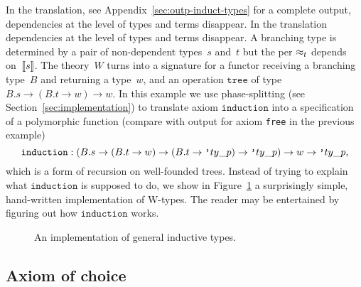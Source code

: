 \iflong
In the translation, see Appendix~\ref{sec:outp-induct-types} for a
complete output, dependencies at the level of types and terms disappear.
\else
In the translation dependencies at the level of types and terms disappear.
\fi
%
A branching type is determined by a pair of non-dependent types~$s$
and~$t$ but the per $\approx_t$ depends on~$[\![s]\!]$. The theory~$W$
turns into a signature for a functor receiving a branching type~$B$
and returning a type~$w$, and an operation $\mathtt{tree}$ of type
$B.s \to (B.t \to w) \to w$. In this example we use phase-splitting
(see Section~\ref{sec:implementation}) to translate axiom
$\mathtt{induction}$ into a specification of a polymorphic function
(compare with output for axiom \texttt{free} in the previous example)
%
\begin{equation*}
  \mathtt{induction}:
  (B.s \to (B.t \to w) \to (B.t \to \poly{ty\_p}) \to \poly{ty\_p}) \to w \to \poly{ty\_p},
\end{equation*}
%
which is a form of recursion on well-founded trees. Instead of trying
to explain what $\mathtt{induction}$ is supposed to do, we show in
Figure~\ref{fig:wtype-implementation} a surprisingly simple,
hand-written implementation of W-types. The reader may be entertained
by figuring out how $\mathtt{induction}$ works.
%
\begin{figure}
  \centering
  \caption{An implementation of general inductive types.}
  \label{fig:wtype-implementation}
\end{figure}



\subsection{Axiom of choice}
\label{sec:axiom-choice}

